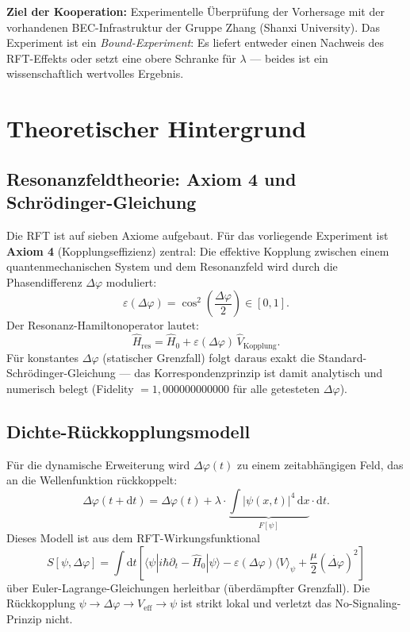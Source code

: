 \documentclass[a4paper,11pt]{article}
\begin{document}
\textbf{Ziel der Kooperation:} Experimentelle Überprüfung der Vorhersage mit
der vorhandenen BEC-Infrastruktur der Gruppe Zhang (Shanxi University).
Das Experiment ist ein \emph{Bound-Experiment}: Es liefert entweder einen
Nachweis des RFT-Effekts oder setzt eine obere Schranke für $\lambda$ ---
beides ist ein wissenschaftlich wertvolles Ergebnis.

\newpage
\tableofcontents
\newpage

\section{Theoretischer Hintergrund}

\subsection{Resonanzfeldtheorie: Axiom 4 und Schrödinger-Gleichung}

Die RFT ist auf sieben Axiome aufgebaut. Für das vorliegende Experiment
ist \textbf{Axiom 4} (Kopplungseffizienz) zentral: Die effektive Kopplung
zwischen einem quantenmechanischen System und dem Resonanzfeld wird durch
die Phasendifferenz $\Delta\varphi$ moduliert:
\[
  \varepsilon(\Delta\varphi) = \cos^2\!\left(\frac{\Delta\varphi}{2}\right) \in [0, 1].
\]
Der Resonanz-Hamiltonoperator lautet:
\[
  \hat{H}_{\mathrm{res}} = \hat{H}_0 + \varepsilon(\Delta\varphi)\,\hat{V}_{\mathrm{Kopplung}}.
\]
Für konstantes $\Delta\varphi$ (statischer Grenzfall) folgt daraus exakt die
Standard-Schrödinger-Gleichung --- das Korrespondenzprinzip ist damit analytisch
und numerisch belegt (Fidelity $= 1{,}000000000000$ für alle getesteten $\Delta\varphi$).

\subsection{Dichte-Rückkopplungsmodell}

Für die dynamische Erweiterung wird $\Delta\varphi(t)$ zu einem zeitabhängigen
Feld, das an die Wellenfunktion rückkoppelt:
\[
  \Delta\varphi(t + \mathrm{d}t) = \Delta\varphi(t)
  + \lambda \cdot \underbrace{\int |\psi(x,t)|^4\,\mathrm{d}x}_{F[\psi]} \cdot \mathrm{d}t.
\]
Dieses Modell ist aus dem RFT-Wirkungsfunktional
\[
  S[\psi, \Delta\varphi] = \int \mathrm{d}t \left[
    \langle\psi|i\hbar\partial_t - \hat{H}_0|\psi\rangle
    - \varepsilon(\Delta\varphi)\langle V\rangle_\psi
    + \frac{\mu}{2}(\dot{\Delta\varphi})^2
  \right]
\]
über Euler-Lagrange-Gleichungen herleitbar (überdämpfter Grenzfall).
Die Rückkopplung $\psi \to \Delta\varphi \to V_{\mathrm{eff}} \to \psi$ ist
strikt lokal und verletzt das No-Signaling-Prinzip nicht.
\end{document}
